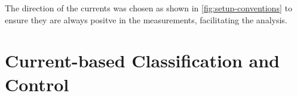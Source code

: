 \documentclass[oneside,12pt]{article}
\begin{document}
The direction of the currents was chosen as shown in \autoref{fig:setup-conventions} to ensure they are always positve 
in the measurements, facilitating the analysis.

\section{Current-based Classification and Control}\label{sec:current-based}






\end{document}
